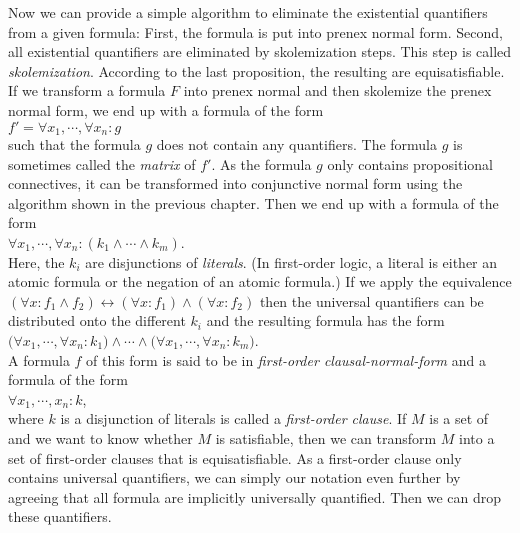 Now we can provide a simple algorithm to eliminate the existential quantifiers from a
given formula:  First, the formula is put into prenex normal form.  Second, all
existential quantifiers are eliminated by skolemization steps.  This step  is called
\emph{skolemization}. According to the last
proposition, the resulting \formulae are equisatisfiable.  
If we transform a formula $F$ into prenex normal and then skolemize the prenex normal form,
we end up with a formula of the form
\\[0.2cm]
\hspace*{1.3cm} 
$f' = \forall x_1, \cdots, \forall x_n: g$ 
\\[0.2cm]
such that the formula  $g$ does not contain any quantifiers. The formula $g$ is sometimes called the
\emph{matrix} of $f'$.
As the formula $g$ only contains propositional connectives, it can be transformed into
conjunctive normal form using the algorithm shown  in the previous chapter.  Then we end
up with a formula of the form
\\[0.2cm]
\hspace*{1.3cm} $\forall x_1, \cdots, \forall x_n: (k_1 \wedge \cdots \wedge k_m)$. 
\\[0.2cm]
Here, the  $k_i$ are disjunctions of  \emph{literals}.  (In first-order logic, a literal
is either an atomic formula or the negation of an atomic formula.)  If we apply the equivalence
$(\forall x\colon f_1\wedge f_2) \leftrightarrow (\forall x\colon f_1) \wedge (\forall x\colon f_2)$
then the universal quantifiers can be distributed onto the different  $k_i$ and the resulting
formula has the form  
\\[0.2cm]
\hspace*{1.3cm} 
$\big(\forall x_1, \cdots, \forall x_n: k_1\big) \wedge \cdots \wedge 
 \big(\forall x_1, \cdots, \forall x_n: k_m\big)$. 
\\[0.2cm]
A formula  $f$ of this form is said to be in 
 {\em first-order clausal-normal-form} and a formula of the form
 \\[0.2cm]
\hspace*{1.3cm} $\forall x_1, \cdots, x_n: k$, \\[0.2cm]
where $k$ is a disjunction of literals is called a \emph{first-order clause}.
If $M$ is a set of \formulae and we want to know whether $M$ is satisfiable, then we can
transform $M$ into a set of first-order clauses that is equisatisfiable.
As a first-order clause only contains universal quantifiers, we can simply our notation
even further by agreeing that all formula are implicitly universally quantified.  Then we
can drop these quantifiers.

